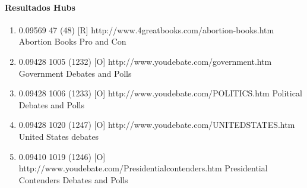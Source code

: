\paragraph{Resultados Hubs}
\begin{enumerate}
\item
0.09569
47 (48) [R]
http://www.4greatbooks.com/abortion-books.htm
Abortion Books Pro and Con

\item
0.09428
1005 (1232) [O]
http://www.youdebate.com/government.htm
Government Debates and Polls

\item
0.09428
1006 (1233) [O]
http://www.youdebate.com/POLITICS.htm
Political Debates and Polls

\item
0.09428
1020 (1247) [O]
http://www.youdebate.com/UNITEDSTATES.htm
United States debates

\item
0.09410
1019 (1246) [O]
http://www.youdebate.com/Presidentialcontenders.htm
Presidential Contenders Debates and Polls

\end{enumerate}





